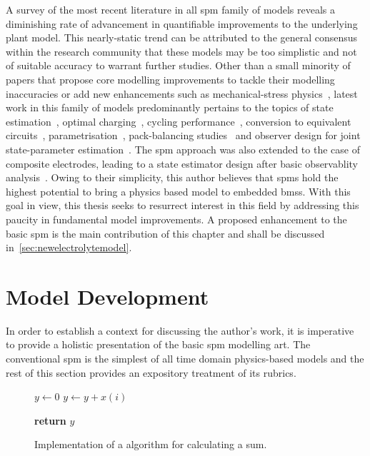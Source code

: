 A  survey of  the  most recent  literature  in all  \gls{spm}  family of  models
reveals  a  diminishing rate  of  advancement  in quantifiable  improvements  to
the  underlying  plant  model.  This   nearly-static  trend  can  be  attributed
to  the  general consensus  within  the  research  community that  these  models
may  be  too  simplistic  and  not  of  suitable  accuracy  to  warrant  further
studies.   Other  than   a  small   minority   of  papers   that  propose   core
modelling  improvements  to  tackle  their modelling  inaccuracies  or  add  new
enhancements  such as  mechanical-stress physics~\cite{Li2017a,Li2018b},  latest
work  in   this  family   of  models  predominantly   pertains  to   the  topics
of    state   estimation~\cite{Chaochun2018,Lin2017,Tran2017,Moura2017,Zou2016},
optimal    charging~\cite{Perez2015},    cycling    performance~\cite{Maia2017},
conversion           to            equivalent           circuits~\cite{Li2017b},
parametrisation~\cite{Li2018,Rajabloo2017,Bizeray2017,Namor2017}, pack-balancing
studies~\cite{Docimo2014}   and  observer   design  for   joint  state-parameter
estimation~\cite{Ascencio2016}. The \gls{spm} approach  was also extended to the
case  of  composite  electrodes,  leading  to a  state  estimator  design  after
basic  observablity  analysis~\cite{Bartlett2015}.  Owing to  their  simplicity,
this  author  believes that  \gls{spm}s  hold  the  highest potential  to  bring
a  physics  based  model  to  embedded  \gls{bms}s.  With  this  goal  in  view,
this  thesis seeks  to  resurrect  interest in  this  field  by addressing  this
paucity in fundamental  model improvements. A proposed enhancement  to the basic
\gls{spm}  is the  main  contribution of  this chapter  and  shall be  discussed
in~\cref{sec:newelectrolytemodel}.

\section{Model Development}\label{sec:spmmodeldevelopment}

In  order  to establish  a  context  for discussing  the  author's  work, it  is
imperative to provide  a holistic presentation of the  basic \gls{spm} modelling
art. The conventional \gls{spm} is the simplest of all time domain physics-based
models and  the rest  of this  section provides an  expository treatment  of its
rubrics.




\begin{figure}[htb]
    \begin{algorithmic}[1]


        \State $y\gets0$
         
        \State $y\gets y+x(i)$ 
        \EndFor

        \State \textbf{return}  $y$
        \EndProcedure
    \end{algorithmic}
    \caption[Implementation of a algorithm for calculating a sum.]{Implementation of a algorithm for calculating a sum.}
    \label{fig:algorithm1}
\end{figure}

